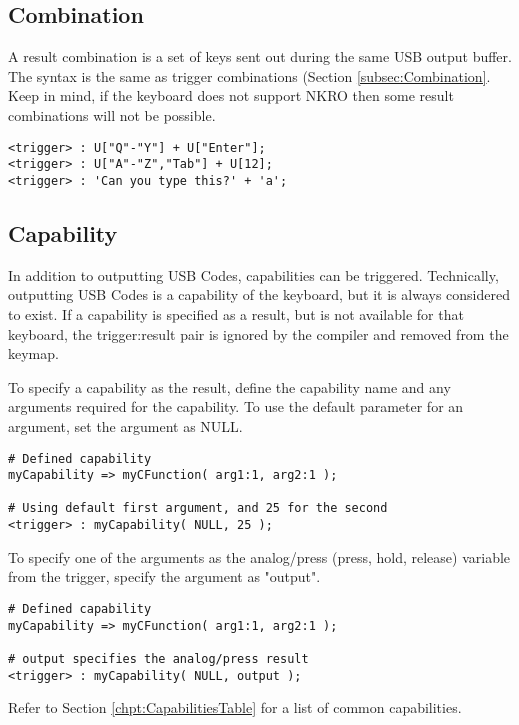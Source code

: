 \documentclass{kiibohd-template}
\begin{document}
\subsection{Combination}

A result combination is a set of keys sent out during the same USB output buffer.
The syntax is the same as trigger combinations (Section \ref{subsec:Combination}.
Keep in mind, if the keyboard does not support NKRO then some result combinations will not be possible.

\begin{lstlisting}
<trigger> : U["Q"-"Y"] + U["Enter"];
<trigger> : U["A"-"Z","Tab"] + U[12];
<trigger> : 'Can you type this?' + 'a';
\end{lstlisting}


\subsection{Capability}

In addition to outputting USB Codes, capabilities can be triggered.
Technically, outputting USB Codes is a capability of the keyboard, but it is always considered to exist.
If a capability is specified as a result, but is not available for that keyboard, the trigger:result pair is ignored by the compiler and removed from the keymap.

To specify a capability as the result, define the capability name and any arguments required for the capability.
To use the default parameter for an argument, set the argument as NULL.

\begin{lstlisting}
# Defined capability
myCapability => myCFunction( arg1:1, arg2:1 );

# Using default first argument, and 25 for the second
<trigger> : myCapability( NULL, 25 );
\end{lstlisting}

To specify one of the arguments as the analog/press (press, hold, release) variable from the trigger, specify the argument as "output".

\begin{lstlisting}
# Defined capability
myCapability => myCFunction( arg1:1, arg2:1 );

# output specifies the analog/press result
<trigger> : myCapability( NULL, output );
\end{lstlisting}

Refer to Section \ref{chpt:CapabilitiesTable} for a list of common capabilities.
\end{document}
